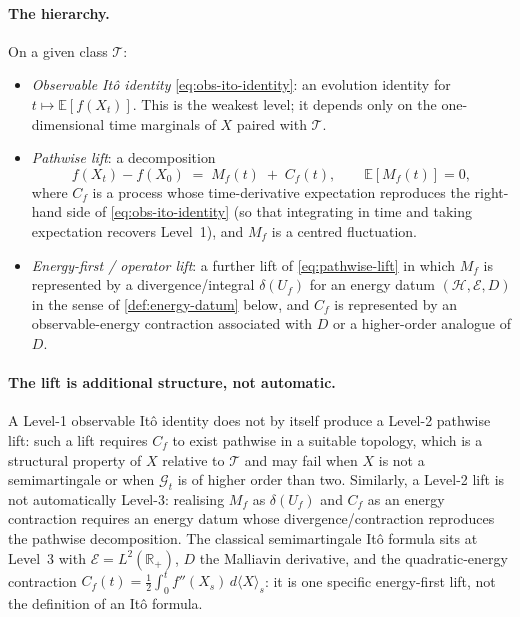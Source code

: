 \documentclass[11pt,reqno]{amsart}
\theoremstyle{plain}
\theoremstyle{definition}
\theoremstyle{remark}
\newcommand{\R}{\mathbb{R}}
\newcommand{\E}{\mathbb{E}}
\newcommand{\Hilb}{\mathcal{H}}
\newcommand{\Energy}{\mathcal{E}}
\begin{document}
\paragraph{The hierarchy.} On a given class $\mathcal T$:
\begin{itemize}
\item[\textbf{Level 1.}] \emph{Observable It\^o identity}
  \eqref{eq:obs-ito-identity}: an evolution identity for
  $t\mapsto\E[f(X_t)]$. This is the weakest level; it depends only
  on the one-dimensional time marginals of $X$ paired with
  $\mathcal T$.
\item[\textbf{Level 2.}] \emph{Pathwise lift}: a decomposition
  \begin{equation}\label{eq:pathwise-lift}
    f(X_t)-f(X_0)\;=\;M_f(t)\;+\;C_f(t),
    \qquad \E[M_f(t)]=0,
  \end{equation}
  where $C_f$ is a process whose time-derivative expectation
  reproduces the right-hand side of \eqref{eq:obs-ito-identity}
  (so that integrating in time and taking expectation recovers
  Level~1), and $M_f$ is a centred fluctuation.
\item[\textbf{Level 3.}] \emph{Energy-first / operator lift}: a
  further lift of \eqref{eq:pathwise-lift} in which $M_f$ is
  represented by a divergence/integral $\delta(U_f)$ for an energy
  datum $(\Hilb,\Energy,D)$ in the sense of \cref{def:energy-datum}
  below, and $C_f$ is represented by an observable-energy
  contraction associated with $D$ or a higher-order analogue
  of $D$.
\end{itemize}

\paragraph{The lift is additional structure, not automatic.}
A Level-1 observable It\^o identity does not by itself produce a
Level-2 pathwise lift: such a lift requires $C_f$ to exist
pathwise in a suitable topology, which is a structural property of
$X$ relative to $\mathcal T$ and may fail when $X$ is not a
semimartingale or when $\mathcal G_t$ is of higher order than two.
Similarly, a Level-2 lift is not automatically Level-3: realising
$M_f$ as $\delta(U_f)$ and $C_f$ as an energy contraction requires
an energy datum whose divergence/contraction reproduces the
pathwise decomposition. The classical semimartingale It\^o formula
sits at Level~3 with $\Energy=L^{2}(\R_{+})$, $D$ the Malliavin
derivative, and the quadratic-energy contraction
$C_f(t)=\tfrac12\int_0^t f''(X_s)\,d\langle X\rangle_s$: it is one
specific energy-first lift, not the definition of an It\^o formula.
\end{document}
